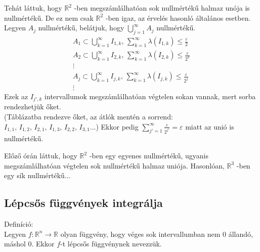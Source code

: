 \documentclass[12pt,a4paper]{scrartcl}
\newenvironment{definicio}{}{}
\begin{document}
Tehát láttuk, hogy \({\mathbb{R}}^{2}\) -ben megszámlálhatóan sok
nullmértékű halmaz unója is nullmértékű. De ez nem csak
\({\mathbb{R}}^{2}\) -ben igaz, az érvelés hasonló általános esetben.
Legyen \(A_{j}\) nullmértékű, belátjuk, hogy
\(\bigcup\limits_{j = 1}^{\infty}A_{j}\) nullmértékű.
\[\begin{array}{*{20}{c}}
  {{A_1} \subset \bigcup\limits_{k = 1}^\infty  {{I_{1,k}}} ,\,\mathop \sum \limits_{k = 1}^\infty  \lambda \left( {{I_{1,k}}} \right) \leqslant \frac{\varepsilon }{2}} \\ 
  {{A_2} \subset \bigcup\limits_{k = 1}^\infty  {{I_{2,k}}} ,\,\mathop \sum \limits_{k = 1}^\infty  \lambda \left( {{I_{2,k}}} \right) \leqslant \frac{\varepsilon }{{{2^2}}}} \\ 
   \vdots  \\ 
  {{A_j} \subset \bigcup\limits_{k = 1}^\infty  {{I_{j,k}}} ,\,\mathop \sum \limits_{k = 1}^\infty  \lambda \left( {{I_{j,k}}} \right) \leqslant \frac{\varepsilon }{{{2^j}}}} \\ 
   \vdots  
\end{array}\] Ezek az \(I_{j',k}\) intervallumok megszámlálhatóan
végtelen sokan vannak, mert sorba rendezhetjük őket.\\
(Táblázatba rendezve őket, az átlók mentén a sorrend:
\(I_{1,1},\, I_{1,2},\, I_{2,1},\, I_{1,3},\, I_{2,2},\, I_{3,1}\ldots\))
Ekkor pedig
\(\sum\limits_{j' = 1}^{\infty}{\frac{\varepsilon}{2^{j'}} = \varepsilon}\)
miatt az unió is nullmértékű.

Előző órán láttuk, hogy \({\mathbb{R}}^{2}\) -ben egy egyenes
nullmértékű, ugyanis megszámlálhatóan végtelen sok nullmértékű halmaz
uniója. Hasonlóan, \({\mathbb{R}}^{3}\) -ben egy sík nullmértékű...

\hypertarget{lepcsos-fuggvenyek-integralja}{%
\subsection{Lépcsős függvények
integrálja}\label{lepcsos-fuggvenyek-integralja}}

\begin{definicio}

Definíció:\\
Legyen \(\left. f:{\mathbb{R}}^{n}\rightarrow{\mathbb{R}} \right.\)
olyan függvény, hogy véges sok intervallumban nem 0 állandó, máshol 0.
Ekkor \(f\)-t lépcsős függvénynek nevezzük.

\end{definicio}
\end{document}
